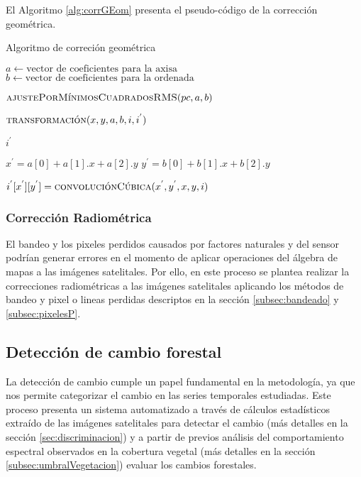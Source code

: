 El Algoritmo \ref{alg:corrGEom} presenta el pseudo-código de la correcci\'on geom\'etrica.

\begin{algorithm}
	\caption{Algoritmo de correci\'on geom\'etrica}
	\label{alg:corrGEom}
	\begin{algorithmic}[1]
		\Statex
		
		\State $a \gets \text{vector de coeficientes para la axisa}$
		\State $b \gets \text{vector de coeficientes para la ordenada}$
		
		\State $\textsc{ajustePorM\'inimosCuadradosRMS}(pc,a,b)$
		
		\State 

		
					\State $\textsc{transformaci\'on}(x,y,a,b,i,i^{'})$
				\EndFor
			\EndFor
			
			\Return $ i^{'} $
		
		\EndFunction
		
		\State
		\State
			\State $x^{'} = a[0]+a[1].x+a[2].y$
			\State $y^{'} = b[0]+b[1].x+b[2].y$
			
			\State $i^{'}[x^{'}][y^{'}]=\textsc{convoluci\'onC\'ubica}(x^{'},y^{'},x,y,i)$
			
		\EndProcedure
	\end{algorithmic}
\end{algorithm}


\subsubsection{Correcci\'on Radiom\'etrica}
El bandeo y los pixeles perdidos causados por factores naturales y del sensor podr\'ian generar errores en el momento de aplicar operaciones del \'algebra de mapas a las im\'agenes satelitales. Por ello, en este proceso se plantea realizar la correcciones radiom\'etricas a las im\'agenes satelitales aplicando los m\'etodos de bandeo y pixel o lineas perdidas descriptos en la secci\'on \ref{subsec:bandeado} y \ref{subsec:pixelesP}.

\subsection{Detecci\'on de cambio forestal}
La detecci\'on de cambio cumple un papel fundamental en la metodolog\'ia, ya que nos permite categorizar el cambio en las series temporales estudiadas. Este proceso presenta un sistema automatizado a trav\'es de c\'alculos estad\'isticos extra\'ido de las im\'agenes satelitales para detectar el cambio (m\'as detalles en la secci\'on \ref{sec:discriminacion}) y a partir de previos an\'alisis del comportamiento espectral observados en la cobertura vegetal (m\'as detalles en la secci\'on \ref{subsec:umbralVegetacion}) evaluar los cambios forestales.

